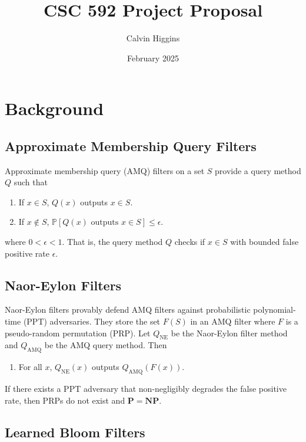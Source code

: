 \documentclass{article}
\title{CSC 592 Project Proposal}
\author{Calvin Higgins}
\date{February 2025}
\begin{document}
\maketitle

\section{Background}

\subsection{Approximate Membership Query Filters}

Approximate membership query (AMQ) filters on a set $S$ provide a query method $Q$ such that
\begin{enumerate}
    \item If $x \in S$, $Q(x)$ outputs $x \in S$.
    \item If $x \not \in S$, $\mathbb{P}[Q(x) \text{ outputs } x \in S] \leq \epsilon$.
\end{enumerate}
where $0 < \epsilon < 1$. That is, the query method $Q$ checks if $x \in S$ with bounded false positive rate $\epsilon$.

\subsection{Naor-Eylon Filters}

Naor-Eylon filters \cite{naor_eylon_2019} provably defend AMQ filters against probabilistic polynomial-time (PPT) adversaries. They store the set $F(S)$ in an AMQ filter where $F$ is a pseudo-random permutation (PRP). Let $Q_\text{NE}$ be the Naor-Eylon filter method and $Q_\text{AMQ}$ be the AMQ query method. Then
\begin{enumerate}
    \item For all $x$, $Q_\text{NE}(x)$ outputs $Q_\text{AMQ}(F(x))$.
\end{enumerate}
If there exists a PPT adversary that non-negligibly degrades the false positive rate, then PRPs do not exist and $\mathbf{P} =\mathbf{NP}$.

\subsection{Learned Bloom Filters}
\end{document}
